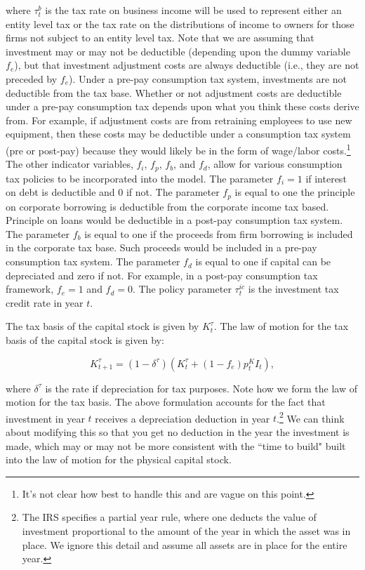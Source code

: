 \noindent\noindent  where $\tau^{b}_{t}$ is the tax rate on business income will be used to represent either an entity level tax or the tax rate on the distributions of income to owners for those firms not subject to an entity level tax.  Note that we are assuming that investment may or may not be deductible (depending upon the dummy variable $f_{e}$), but that investment adjustment costs are always deductible (i.e., they are not preceded by $f_{e}$).  Under a pre-pay consumption tax system, investments are not deductible from the tax base.  Whether or not adjustment costs are deductible under a pre-pay consumption tax depends upon what you think these costs derive from.  For example, if adjustment costs are from retraining employees to use new equipment, then these costs may be deductible under a consumption tax system (pre or post-pay) because they would likely be in the form of wage/labor costs.\footnote{It's not clear how best to handle this and \citet{DZ2013} are vague on this point.}  The other indicator variables, $f_{i}$, $f_{p}$, $f_{b}$, and $f_{d}$, allow for various consumption tax policies to be incorporated into the model.  The parameter $f_{i}=1$ if interest on debt is deductible and 0 if not.  The parameter $f_{p}$ is equal to one the principle on corporate borrowing is deductible from the corporate income tax based.  Principle on loans would be deductible in a post-pay consumption tax system.  The parameter $f_{b}$ is equal to one if the proceeds from firm borrowing is included in the corporate tax base.  Such proceeds would be included in a pre-pay consumption tax system.  The parameter $f_{d}$ is equal to one if capital can be depreciated and zero if not.  For example, in a post-pay consumption tax framework, $f_{e}=1$ and $f_{d}=0$.  The policy parameter $\tau^{ic}_{t}$ is the investment tax credit rate in year $t$.

The tax basis of the capital stock is given by $K^{\tau}_{t}$.  The law of motion for the tax basis of the capital stock is given by:

\begin{equation}
\label{eqn:lom_taxcapital}
K^{\tau}_{t+1}=(1-\delta^{\tau})(K^{\tau}_{t} + (1-f_{e})p^{K}_{t}I_{t}),
\end{equation}

\noindent\noindent where $\delta^{\tau}$ is the rate if depreciation for tax purposes.  Note how we form the law of motion for the tax basis.  The above formulation accounts for the fact that investment in year $t$ receives a depreciation deduction in year $t$.\footnote{The IRS specifies a partial year rule, where one deducts the value of investment proportional to the amount of the year in which the asset was in place.  We ignore this detail and assume all assets are in place for the entire year.}  We can think about modifying this so that you get no deduction in the year the investment is made, which may or may not be more consistent with the ``time to build" built into the law of motion for the physical capital stock.

